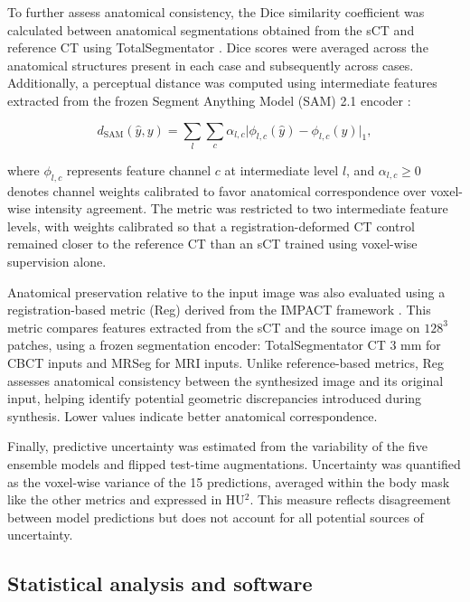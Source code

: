 \documentclass{article}
\begin{document}
To further assess anatomical consistency, the Dice similarity coefficient was calculated between anatomical segmentations obtained from the sCT and reference CT using TotalSegmentator \cite{wasserthal2023totalsegmentator}. Dice scores were averaged across the anatomical structures present in each case and subsequently across cases. Additionally, a perceptual distance was computed using intermediate features extracted from the frozen Segment Anything Model (SAM) 2.1 encoder \cite{ravi2025sam2}:

\begin{equation}
d_{\mathrm{SAM}}(\hat{y},y) = \sum_{l}\sum_{c} \alpha_{l,c}\bigl| \phi_{l,c}(\hat{y}) - \phi_{l,c}(y) \bigr|_1 ,
\end{equation}

where $\phi_{l,c}$ represents feature channel $c$ at intermediate level $l$, and $\alpha_{l,c}\geq0$ denotes channel weights calibrated to favor anatomical correspondence over voxel-wise intensity agreement. The metric was restricted to two intermediate feature levels, with weights calibrated so that a registration-deformed CT control remained closer to the reference CT than an sCT trained using voxel-wise supervision alone.

Anatomical preservation relative to the input image was also evaluated using a registration-based metric (Reg) derived from the IMPACT framework \cite{boussot2025impact}. This metric compares features extracted from the sCT and the source image on $128^3$ patches, using a frozen segmentation encoder: TotalSegmentator CT 3 mm for CBCT inputs and MRSeg for MRI inputs. Unlike reference-based metrics, Reg assesses anatomical consistency between the synthesized image and its original input, helping identify potential geometric discrepancies introduced during synthesis. Lower values indicate better anatomical correspondence.

Finally, predictive uncertainty was estimated from the variability of the five ensemble models and flipped test-time augmentations. Uncertainty was quantified as the voxel-wise variance of the 15 predictions, averaged within the body mask like the other metrics and expressed in HU$^2$. This measure reflects disagreement between model predictions but does not account for all potential sources of uncertainty.


\subsection{Statistical analysis and software}
\end{document}
